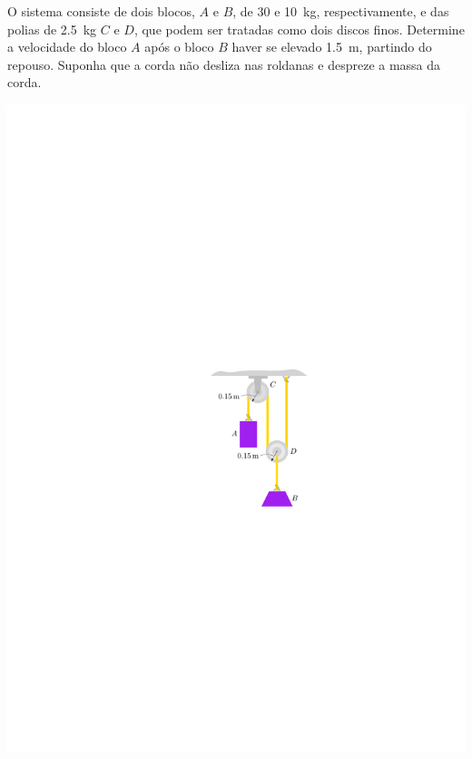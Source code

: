 \begin{minipage}{.6\linewidth}
	\vspace{-3cm}
	\item O sistema consiste de dois blocos, $A$ e $B$, de 30 e \SI{10}{\kilogram}, respectivamente, e das polias de \SI{2.5}{\kilogram} $C$ e $D$, que podem ser tratadas como dois discos finos. Determine a velocidade do bloco $A$ após o bloco $B$
	haver se elevado \SI{1.5}{\meter}, partindo do repouso. Suponha que a corda não desliza nas roldanas e despreze
	a massa da corda.
\end{minipage}
\begin{minipage}{.4\linewidth}
	\begin{flushright}
		\includegraphics[scale=1.2]{../../images/draw_5}
	\end{flushright}
\end{minipage}